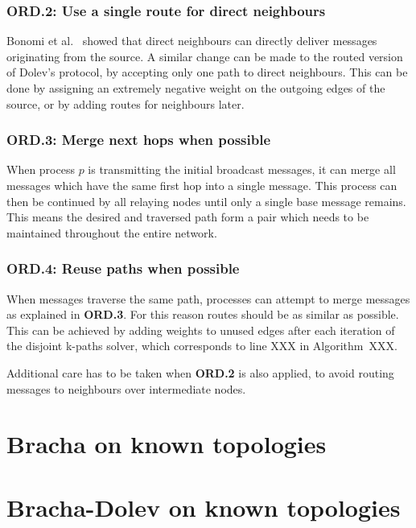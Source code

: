 \subsubsection{ORD.2: Use a single route for direct neighbours}
Bonomi et al.~\cite{bonomi2019multihop} showed that direct neighbours can directly deliver messages originating from the source. A similar change can be made to the routed version of Dolev's protocol, by accepting only one path to direct neighbours. This can be done by assigning an extremely negative weight on the outgoing edges of the source, or by adding routes for neighbours later.

\subsubsection{ORD.3: Merge next hops when possible}
When process $p$ is transmitting the initial broadcast messages, it can merge all messages which have the same first hop into a single message. This process can then be continued by all relaying nodes until only a single base message remains. This means the desired and traversed path form a pair which needs to be maintained throughout the entire network. 

\subsubsection{ORD.4: Reuse paths when possible}
When messages traverse the same path, processes can attempt to merge messages as explained in \textbf{ORD.3}. For this reason routes should be as similar as possible. This can be achieved by adding weights to unused edges after each iteration of the disjoint k-paths solver, which corresponds to line XXX in Algorithm~XXX.

Additional care has to be taken when \textbf{ORD.2} is also applied, to avoid routing messages to neighbours over intermediate nodes.

\section{Bracha on known topologies}

\section{Bracha-Dolev on known topologies}
